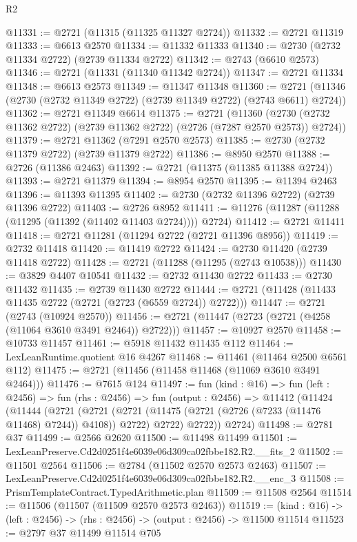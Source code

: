 \begin{lexlean}{R2}
\begin{coremodule}
@11331 := @2721 (@11315 (@11325 @11327 @2724))
@11332 := @2721 @11319
@11333 := @6613 @2570
@11334 := @11332 @11333
@11340 := @2730 (@2732 @11334 @2722) (@2739 @11334 @2722)
@11342 := @2743 (@6610 @2573)
@11346 := @2721 (@11331 (@11340 @11342 @2724))
@11347 := @2721 @11334
@11348 := @6613 @2573
@11349 := @11347 @11348
@11360 := @2721 (@11346 (@2730 (@2732 @11349 @2722) (@2739 @11349 @2722) (@2743 @6611) @2724))
@11362 := @2721 @11349 @6614
@11375 := @2721
    (@11360 (@2730 (@2732 @11362 @2722) (@2739 @11362 @2722) (@2726 (@7287 @2570 @2573)) @2724))
@11379 := @2721 @11362 (@7291 @2570 @2573)
@11385 := @2730 (@2732 @11379 @2722) (@2739 @11379 @2722)
@11386 := @8950 @2570
@11388 := @2726 (@11386 @2463)
@11392 := @2721 (@11375 (@11385 @11388 @2724))
@11393 := @2721 @11379
@11394 := @8954 @2570
@11395 := @11394 @2463
@11396 := @11393 @11395
@11402 := @2730 (@2732 @11396 @2722) (@2739 @11396 @2722)
@11403 := @2726 @8952
@11411 := @11276 (@11287 (@11288 (@11295 (@11392 (@11402 @11403 @2724)))) @2724)
@11412 := @2721 @11411
@11418 := @2721 @11281 (@11294 @2722 (@2721 @11396 @8956))
@11419 := @2732 @11418
@11420 := @11419 @2722
@11424 := @2730 @11420 (@2739 @11418 @2722)
@11428 := @2721 (@11288 (@11295 (@2743 @10538)))
@11430 := @3829 @4407 @10541
@11432 := @2732 @11430 @2722
@11433 := @2730 @11432
@11435 := @2739 @11430 @2722
@11444 := @2721 (@11428 (@11433 @11435 @2722 (@2721 (@2723 (@6559 @2724)) @2722)))
@11447 := @2721 (@2743 (@10924 @2570))
@11456 := @2721 (@11447 (@2723 (@2721 (@4258 (@11064 @3610 @3491 @2464)) @2722)))
@11457 := @10927 @2570
@11458 := @10733 @11457
@11461 := @5918 @11432 @11435 @112
@11464 := LexLeanRuntime.quotient @16 @4267
@11468 := @11461 (@11464 @2500 @6561 @112)
@11475 := @2721 (@11456 (@11458 @11468 (@11069 @3610 @3491 @2464)))
@11476 := @7615 @124
@11497 := fun (kind : @16) =>
  fun (left : @2456) =>
  fun (rhs : @2456) =>
  fun (output : @2456) =>
  @11412
    (@11424
      (@11444
        (@2721
          (@2721 (@2721 (@11475 (@2721 (@2726 (@7233 (@11476 @11468) @7244)) @4108)) @2722) @2722)
          @2722))
      @2724)
@11498 := @2781 @37
@11499 := @2566 @2620
@11500 := @11498 @11499
@11501 := LexLeanPreserve.Cd2d0251f4e6039e06d309ca02fbbe182.R2.__fits_2
@11502 := @11501 @2564
@11506 := @2784 (@11502 @2570 @2573 @2463)
@11507 := LexLeanPreserve.Cd2d0251f4e6039e06d309ca02fbbe182.R2.__enc_3
@11508 := PrismTemplateContract.TypedArithmetic.plan
@11509 := @11508 @2564
@11514 := @11506 (@11507 (@11509 @2570 @2573 @2463))
@11519 := (kind : @16) -> (left : @2456) -> (rhs : @2456) -> (output : @2456) -> @11500 @11514
@11523 := @2797 @37 @11499 @11514 @705

\end{coremodule}
\end{lexlean}
